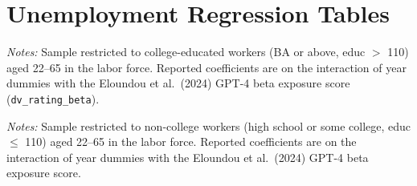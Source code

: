 \documentclass[11pt]{article}
\begin{document}
\clearpage

\section{Unemployment Regression Tables}

\begin{table}[H]
\begin{center}
\caption{Unemployment Table A --- college subsample. Dependent variable: binary unemployment indicator. Columns (1)--(3): no fixed effects, sex FE, sex + education FE. Year 2022 is the omitted baseline. Standard errors clustered at the occupation level. $^{*}p<0.10$, $^{**}p<0.05$, $^{***}p<0.01$.}
\label{tab:unemp_A_col}
\resizebox{0.9\textwidth}{!}{}
\end{center}
\smallskip
\noindent\footnotesize\textit{Notes:} Sample restricted to college-educated workers (BA or above, educ $>$ 110) aged 22--65 in the labor force. Reported coefficients are on the interaction of year dummies with the Eloundou et al.\ (2024) GPT-4 beta exposure score (\texttt{dv\_rating\_beta}).
\end{table}

\begin{table}[H]
\begin{center}
\caption{Unemployment Table A --- non-college subsample. Dependent variable: binary unemployment indicator. Columns (1)--(3): no fixed effects, sex FE, sex + education FE. Year 2022 is the omitted baseline. Standard errors clustered at the occupation level. $^{*}p<0.10$, $^{**}p<0.05$, $^{***}p<0.01$.}
\label{tab:unemp_A_noncol}
\resizebox{0.9\textwidth}{!}{}
\end{center}
\smallskip
\noindent\footnotesize\textit{Notes:} Sample restricted to non-college workers (high school or some college, educ $\leq$ 110) aged 22--65 in the labor force. Reported coefficients are on the interaction of year dummies with the Eloundou et al.\ (2024) GPT-4 beta exposure score.
\end{table}
\end{document}
